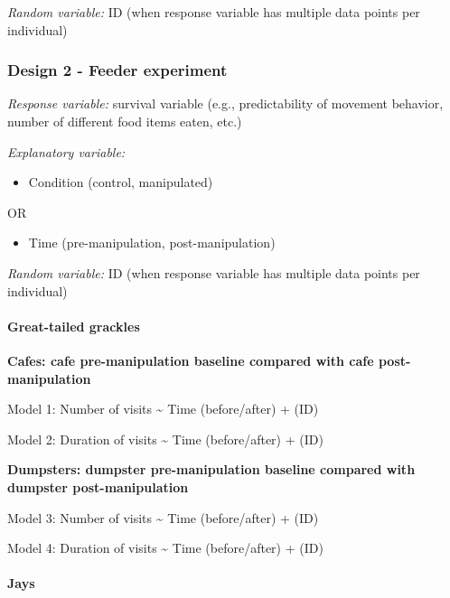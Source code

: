 \documentclass[
]{article}
\providecommand{\tightlist}{%
  \setlength{\itemsep}{0pt}\setlength{\parskip}{0pt}}
\begin{document}
\emph{Random variable:} ID (when response variable has multiple data
points per individual)

\hypertarget{design-2---feeder-experiment-1}{%
\subsubsection{Design 2 - Feeder
experiment}\label{design-2---feeder-experiment-1}}

\emph{Response variable:} survival variable (e.g., predictability of
movement behavior, number of different food items eaten, etc.)

\emph{Explanatory variable:}

\begin{itemize}
\tightlist
\item
  Condition (control, manipulated)
\end{itemize}

OR

\begin{itemize}
\tightlist
\item
  Time (pre-manipulation, post-manipulation)
\end{itemize}

\emph{Random variable:} ID (when response variable has multiple data
points per individual)

\hypertarget{great-tailed-grackles}{%
\paragraph{Great-tailed grackles}\label{great-tailed-grackles}}

\textbf{Cafes: cafe pre-manipulation baseline compared with cafe
post-manipulation}

Model 1: Number of visits \textasciitilde{} Time (before/after) + (ID)

Model 2: Duration of visits \textasciitilde{} Time (before/after) + (ID)

\textbf{Dumpsters: dumpster pre-manipulation baseline compared with
dumpster post-manipulation}

Model 3: Number of visits \textasciitilde{} Time (before/after) + (ID)

Model 4: Duration of visits \textasciitilde{} Time (before/after) + (ID)

\hypertarget{jays}{%
\paragraph{Jays}\label{jays}}
\end{document}

